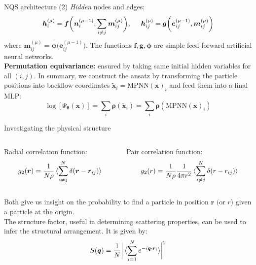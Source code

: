 \documentclass{beamer}
\begin{document}
\begin{frame}{NQS architecture (2)}
\textit{Hidden} nodes and edges:
\begin{equation*}
  \bm{h}_{i}^{(\mu)} = \bm{f}\biggr(\bm{n}_i^{(\mu-1)}, \sum_{i\neq j} \bm{m}_{ij}^{(\mu)}\biggr), \hspace{0.5cm} \bm{h}_{ij}^{(\mu)} = \bm{g} \biggr(\bm{e}_{ij}^{(\mu-1)}, \bm{m}_{ij}^{(\mu)}\biggr)
\end{equation*}
where $\bm{m}_{ij}^{(\mu)} = \bm{\phi}\big(\bm{e}_{ij}^{(\mu-1)}\big)$. The functions $\bm{f},\bm{g},\bm{\phi}$ are simple feed-forward artificial 
neural networks. \\
\textbf{Permutation equivariance:} ensured by taking same initial hidden variables for all $(i,j)$. In summary, we construct the ansatz by transforming the particle positions into backflow coordinates 
$\bm{\tilde{x}}_i = \text{MPNN}(\bm{x})_i$ and feed them into a final MLP:
\begin{equation*}
  \log[\Psi_{\bm{\theta}}(\bm{x})] = \sum_i \bm{\rho}(\bm{\tilde{x}}_i) = \sum_i \bm{\rho}(\text{MPNN}(\bm{x})_i)
\end{equation*}
\end{frame}

\begin{frame}{Investigating the physical structure}
\begin{columns}

\begin{column}{0.5\textwidth}
Radial correlation function:
\begin{equation*}\label{eq:rad_corr}
  g_2(\bm{r}) = \dfrac{1}{N\rho}\braket{\sum_{i\neq j}^N\delta(\bm{r}-\bm{r}_{ij})}
\end{equation*}
\end{column}

\begin{column}{0.5\textwidth}
Pair correlation function:
\begin{equation*}\label{eq:pair_corr}
  g_2(r) = \dfrac{1}{N\rho}\dfrac{1}{4\pi r^2}\braket{\sum_{i\neq j}^N\delta(r-r_{ij})}
\end{equation*} 
\end{column}

\end{columns}
\vspace{0.5cm}
Both give us insight on the probability to find a particle in position $\bm{r}\text{ (or } r$) given a particle at the origin. \\
\vspace{0.5cm}
The structure factor, useful in determining scattering properties, can be used to infer the structural arrangement. It is given by:
\begin{equation*}
S(\bm{q}) = \dfrac{1}{N}\biggr|\braket{\sum_{i=1}^N e^{-i\bm{q}\cdot\bm{r}_i}}\biggr|^2
\end{equation*}
\end{frame}
\end{document}
